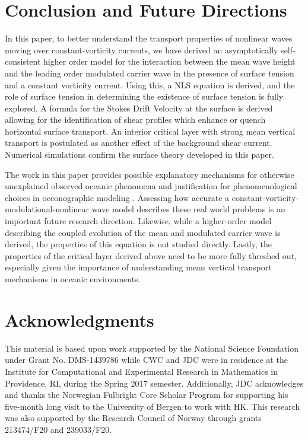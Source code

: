 \documentclass{JFM_Style/jfm}
\begin{document}
\section{Conclusion and Future Directions}

In this paper, to better understand the transport properties of nonlinear waves moving over constant-vorticity currents, we have derived an asymptotically self-consistent higher order model for the interaction between the mean wave height and the leading order modulated carrier wave in the presence of surface tension and a constant vorticity current.  Using this, a NLS equation is derived, and the role of surface tension in determining the existence of surface tension is fully explored.  A formula for the Stokes Drift Velocity at the surface is derived allowing for the identification of shear profiles which enhance or quench horizontal surface transport.  An interior critical layer with strong mean vertical transport is postulated as another effect of the background shear current.  Numerical simulations confirm the surface theory developed in this paper.  

The work in this paper provides possible explanatory mechanisms for otherwise unexplained observed oceanic phenomena \cite{smith} and justification for phenomenological choices in oceonographic modeling \cite{breivik}.  Assessing how accurate a constant-vorticity-modulational-nonlinear wave model describes these real world problems is an important future research direction.  Likewise, while a higher-order model describing the coupled evolution of the mean and modulated carrier wave is derived, the properties of this equation is not studied directly.  Lastly, the properties of the critical layer derived above need to be more fully threshed out, especially given the importance of understanding mean vertical transport mechanisms in oceanic environments.  
\section{Acknowledgments}
This material is based upon work supported by the National Science Foundation under Grant No. DMS-1439786 while CWC and JDC were in residence at the Institute for Computational and Experimental Research in Mathematics in Providence, RI, during the Spring 2017 semester.  Additionally, JDC acknowledges and thanks the Norwegian Fulbright Core Scholar Program for supporting his five-month long visit to the University of Bergen to work with HK. This research was also supported by
the Research Council of Norway through grants 213474/F20 and 239033/F20.



\end{document}
